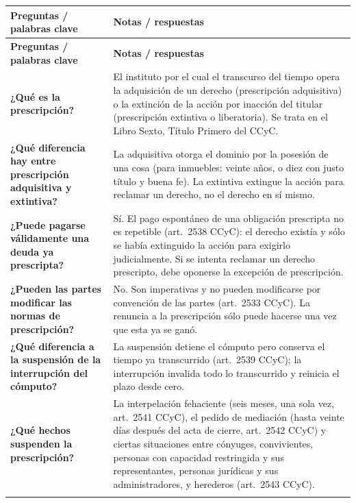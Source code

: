 \documentclass[12pt,oneside]{book}
\newlength{\cornellL}
\newlength{\cornellR}
\begin{document}
{\renewcommand{\arraystretch}{1.2}
\begin{longtable}{
    >{\raggedright\arraybackslash}p{\cornellL}
    >{\raggedright\arraybackslash}p{\cornellR}
}
\toprule
\textbf{Preguntas / palabras clave} &
\textbf{Notas / respuestas} \\
\midrule
\endfirsthead

\toprule
\textbf{Preguntas / palabras clave} &
\textbf{Notas / respuestas} \\
\midrule
\endhead

\textbf{¿Qué es la prescripción?} &
El instituto por el cual el transcurso del tiempo opera la adquisición de un derecho (prescripción adquisitiva) o la extinción de la acción por inacción del titular (prescripción extintiva o liberatoria). Se trata en el Libro Sexto, Título Primero del CCyC. \\
\addlinespace

\textbf{¿Qué diferencia hay entre prescripción adquisitiva y extintiva?} &
La adquisitiva otorga el dominio por la posesión de una cosa (para inmuebles: veinte años, o diez con justo título y buena fe). La extintiva extingue la acción para reclamar un derecho, no el derecho en sí mismo. \\
\addlinespace

\textbf{¿Puede pagarse válidamente una deuda ya prescripta?} &
Sí. El pago espontáneo de una obligación prescripta no es repetible (art.~2538 CCyC): el derecho existía y sólo se había extinguido la acción para exigirlo judicialmente. Si se intenta reclamar un derecho prescripto, debe oponerse la excepción de prescripción. \\
\addlinespace

\textbf{¿Pueden las partes modificar las normas de prescripción?} &
No. Son imperativas y no pueden modificarse por convención de las partes (art.~2533 CCyC). La renuncia a la prescripción sólo puede hacerse una vez que esta ya se ganó. \\
\addlinespace

\textbf{¿Qué diferencia a la suspensión de la interrupción del cómputo?} &
La suspensión detiene el cómputo pero conserva el tiempo ya transcurrido (art.~2539 CCyC); la interrupción invalida todo lo transcurrido y reinicia el plazo desde cero. \\
\addlinespace

\textbf{¿Qué hechos suspenden la prescripción?} &
La interpelación fehaciente (seis meses, una sola vez, art.~2541 CCyC), el pedido de mediación (hasta veinte días después del acta de cierre, art.~2542 CCyC) y ciertas situaciones entre cónyuges, convivientes, personas con capacidad restringida y sus representantes, personas jurídicas y sus administradores, y herederos (art.~2543 CCyC). \\
\addlinespace


\end{longtable}}
\end{document}
